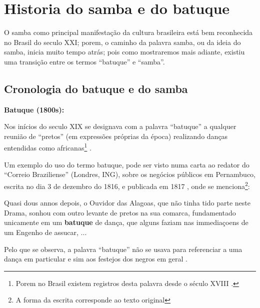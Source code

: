 
\chapter{Historia do samba e do batuque}
O samba como principal manifestação da cultura brasileira está bem reconhecida no Brasil do seculo XXI;
porem, o caminho da palavra samba, ou da ideia do samba, inicia muito tempo atrás;
pois como mostraremos mais adiante, existiu uma transição entre os termos ``batuque'' e ``samba''.


\section{Cronologia do batuque e do samba}

\begin{tcbinformation} 
\textbf{Batuque (1800s):}
\label{ref:batuquedanca1800}

Nos inícios do seculo XIX
se designava com a palavra ``batuque''  a qualquer reunião de ``pretos'' (em expressões próprias da época) realizando danças entendidas como africanas\footnote{
Porem no Brasil existem registros desta palavra desde o século XVIII \cite[pp. 85]{sandroni2001feitico}. }
\cite[pp. 54]{de4danccas} \cite[pp. 73]{lara2007memoria}.
\end{tcbinformation}
Um exemplo do uso do termo batuque, pode ser visto numa carta ao redator do ``Correio Braziliense''  (Londres, ING),
sobre os negócios públicos em Pernambuco,
escrita no dia 3 de dezembro do 1816, e publicada em 1817 \cite[pp. 468]{batuqueBraziliense},
onde se menciona\footnote{\label{footort}A forma da escrita corresponde ao texto original}:
\begin{citando}%
Quasi dous annos depois, o Ouvidor das Alagoas, que não tinha tido parte neste Drama,
sonhou com outro levante de pretos na sua comarca, 
fundamentado unicamente em um \textbf{batuque} de dança, 
que alguns faziam nas immediaçoens de um Engenho de assucar, ...
\end{citando} 
Pelo que se observa, 
a palavra ``batuque'' não se usava para referenciar a uma dança em particular e sim aos festejos dos negros em geral \cite[pp. 85]{sandroni2001feitico}.

